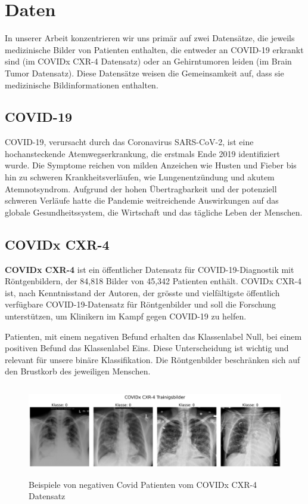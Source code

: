 \section{Daten}\label{chap:Daten}

In unserer Arbeit konzentrieren wir uns primär auf zwei Datensätze, die jeweils medizinische Bilder von Patienten enthalten, die entweder an COVID-19 erkrankt sind (im COVIDx CXR-4 Datensatz) oder an Gehirntumoren leiden (im Brain Tumor Datensatz). Diese Datensätze weisen die Gemeinsamkeit auf, dass sie medizinische Bildinformationen enthalten. 

\subsection{COVID-19} \label{chap:covid19 allgemein}

COVID-19, verursacht durch das Coronavirus SARS-CoV-2, ist eine hochansteckende Atemwegserkrankung, die erstmals Ende 2019 identifiziert wurde. Die Symptome reichen von milden Anzeichen wie Husten und Fieber bis hin zu schweren Krankheitsverläufen, wie Lungenentzündung und akutem Atemnotsyndrom. Aufgrund der hohen Übertragbarkeit und der potenziell schweren Verläufe hatte die Pandemie weitreichende Auswirkungen auf das globale Gesundheitssystem, die Wirtschaft und das tägliche Leben der Menschen. 


\subsection{COVIDx CXR-4} \label{chap:COVIDX-CXR4}
\textbf{COVIDx CXR-4} \cite{wu_covidx_2023} ist ein öffentlicher Datensatz für COVID-19-Diagnostik mit Röntgenbildern, der 84,818 Bilder von 45,342 Patienten enthält. COVIDx CXR-4 ist, nach Kenntnisstand der Autoren, der grösste und vielfältigste öffentlich verfügbare COVID-19-Datensatz für Röntgenbilder und soll die Forschung unterstützen, um Klinikern im Kampf gegen COVID-19 zu helfen.

Patienten, mit einem negativen Befund erhalten das Klassenlabel Null, bei einem positiven Befund das Klassenlabel Eins. Diese Unterscheidung ist wichtig und relevant für unsere binäre Klassifikation. Die Röntgenbilder beschränken sich auf den Brustkorb des jeweiligen Menschen.

\begin{figure}[H]
    \centering
    \includegraphics[width=\linewidth, height=4cm]{01-images/03-data/covid19-klasse0.png}
    \caption{Beispiele von negativen Covid Patienten vom COVIDx CXR-4 Datensatz}
    \label{fig:covid19-klasse0}
\end{figure}

